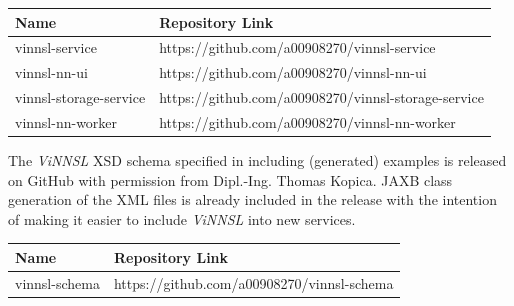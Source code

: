 \begin{longtable}[]{@{}ll@{}}
\toprule
\begin{minipage}[b]{0.29\columnwidth}\raggedright\strut
Name\strut
\end{minipage} & \begin{minipage}[b]{0.65\columnwidth}\raggedright\strut
Repository Link\strut
\end{minipage}\tabularnewline
\midrule
\endhead
\begin{minipage}[t]{0.29\columnwidth}\raggedright\strut
vinnsl-service\strut
\end{minipage} & \begin{minipage}[t]{0.65\columnwidth}\raggedright\strut
https://github.com/a00908270/vinnsl-service\strut
\end{minipage}\tabularnewline
\begin{minipage}[t]{0.29\columnwidth}\raggedright\strut
vinnsl-nn-ui\strut
\end{minipage} & \begin{minipage}[t]{0.65\columnwidth}\raggedright\strut
https://github.com/a00908270/vinnsl-nn-ui\strut
\end{minipage}\tabularnewline
\begin{minipage}[t]{0.29\columnwidth}\raggedright\strut
vinnsl-storage-service\strut
\end{minipage} & \begin{minipage}[t]{0.65\columnwidth}\raggedright\strut
https://github.com/a00908270/vinnsl-storage-service\strut
\end{minipage}\tabularnewline
\begin{minipage}[t]{0.29\columnwidth}\raggedright\strut
vinnsl-nn-worker\strut
\end{minipage} & \begin{minipage}[t]{0.65\columnwidth}\raggedright\strut
https://github.com/a00908270/vinnsl-nn-worker\strut
\end{minipage}\tabularnewline
\bottomrule
\end{longtable}

The \emph{ViNNSL} XSD schema specified in \cite{kopica_2015} including
(generated) examples is released on GitHub with permission from
Dipl.-Ing. Thomas Kopica. JAXB class generation of the XML files is
already included in the release with the intention of making it easier
to include \emph{ViNNSL} into new services.

\begin{longtable}[]{@{}ll@{}}
\toprule
Name & Repository Link\tabularnewline
\midrule
\endhead
vinnsl-schema &
https://github.com/a00908270/vinnsl-schema\tabularnewline
\bottomrule
\end{longtable}

